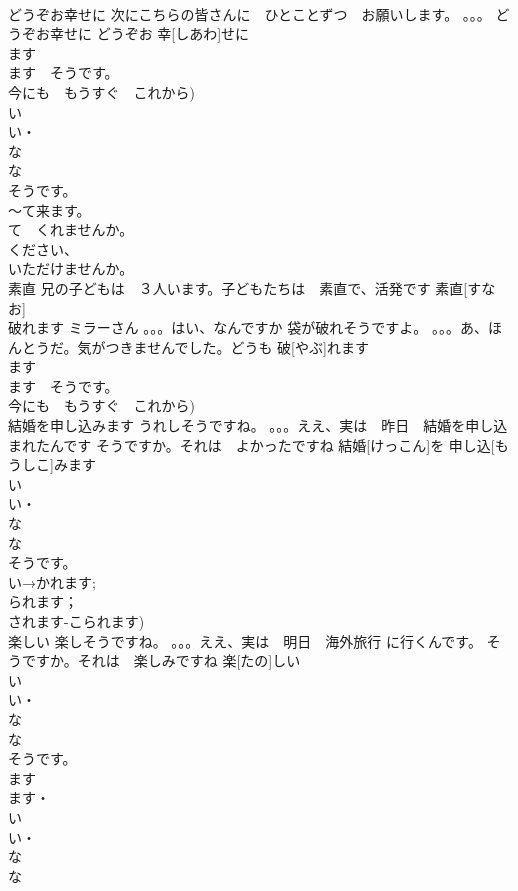 \documentclass[8pt]{extreport}
\begin{document}
\begin{CJK}{UTF8}{min}
\\	どうぞお幸せに	次にこちらの皆さんに　ひとことずつ　お願いします。 。。。 どうぞお幸せに	どうぞお 幸[しあわ]せに			
\\	ます　
\\	ます　そうです。
\\	今にも　もうすぐ　これから) 
\\	い　
\\	い・
\\	な 
\\	な 
\\	そうです。
\\	～て来ます。
\\	て　くれませんか。
\\	ください、
\\	いただけませんか。		
\\	素直	兄の子どもは　３人います。子どもたちは　素直で、活発です	素直[すなお]			
\\	破れます	ミラーさん 。。。はい、なんですか 袋が破れそうですよ。 。。。あ、ほんとうだ。気がつきませんでした。どうも	破[やぶ]れます			
\\	ます　
\\	ます　そうです。
\\	今にも　もうすぐ　これから)	
\\	結婚を申し込みます	うれしそうですね。 。。。ええ、実は　昨日　結婚を申し込まれたんです そうですか。それは　よかったですね	結婚[けっこん]を 申し込[もうしこ]みます			
\\	い　
\\	い・
\\	な 
\\	な 
\\	そうです。
\\	い→かれます;
\\	られます；
\\	されます-こられます)
\\	楽しい	楽しそうですね。 。。。ええ、実は　明日　海外旅行 に行くんです。 そうですか。それは　楽しみですね	楽[たの]しい			
\\	い　
\\	い・
\\	な 
\\	な 
\\	そうです。
\\	ます　
\\	ます・
\\	い
\\	い・
\\	な
\\	な

\end{CJK}
\end{document}
